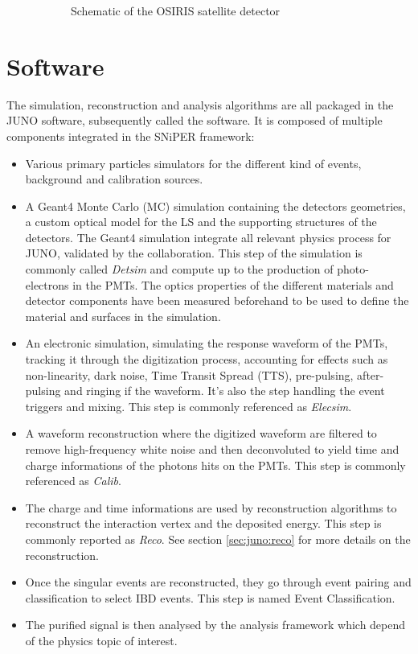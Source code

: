 \begin{figure}[ht]
\begin{subfigure}[t]{0.49\linewidth}
    \caption{Schematic of the OSIRIS satellite detector}
    \label{fig:juno:osiris}
  \end{subfigure}
  \caption{}
\end{figure}

\section{Software}
\label{sec:juno:software}

The simulation, reconstruction and analysis algorithms are all packaged in the JUNO software, subsequently called the software.
It is composed of multiple components integrated in the SNiPER \cite{lin_application_2017} framework:

\begin{itemize}
  \item Various primary particles simulators for the different kind of events, background and calibration sources.
  \item A Geant4 \cite{agostinelli_geant4simulation_2003, allison_geant4_2006, allison_recent_2016} Monte Carlo (MC) simulation containing the detectors geometries, a custom optical model for the LS and the supporting structures of the detectors. The Geant4 simulation integrate all relevant physics process for JUNO, validated by the collaboration. This step of the simulation is commonly called \textit{Detsim} and compute up to the production of photo-electrons in the PMTs. The optics properties of the different materials and detector components have been measured beforehand to be used to define the material and surfaces in the simulation.
  \item An electronic simulation, simulating the response waveform of the PMTs, tracking it through the digitization process, accounting for effects such as non-linearity, dark noise, Time Transit Spread (TTS), pre-pulsing, after-pulsing and ringing if the waveform. It's also the step handling the event triggers and mixing. This step is commonly referenced as \textit{Elecsim}.
  \item A waveform reconstruction where the digitized waveform are filtered to remove high-frequency white noise and then deconvoluted to yield time and charge informations of the photons hits on the PMTs. This step is commonly referenced as \textit{Calib}.
  \item The charge and time informations are used by reconstruction algorithms to reconstruct the interaction vertex and the deposited energy. This step is commonly reported as \textit{Reco}. See section \ref{sec:juno:reco} for more details on the reconstruction.
  \item Once the singular events are reconstructed, they go through event pairing and classification to select IBD events. This step is named Event Classification.
  \item The purified signal is then analysed by the analysis framework which depend of the physics topic of interest.
\end{itemize}


